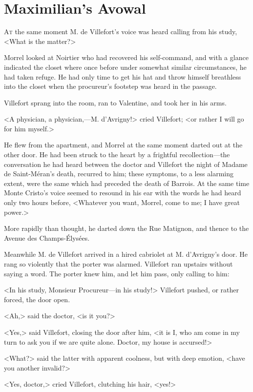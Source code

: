 \chapter{Maximilian's Avowal}

 \lettrine{A}{t} the same moment M. de Villefort's voice was heard calling from his study, <What is the matter?> 

\zz
 Morrel looked at Noirtier who had recovered his self-command, and with a glance indicated the closet where once before under somewhat similar circumstances, he had taken refuge. He had only time to get his hat and throw himself breathless into the closet when the procureur's footstep was heard in the passage. 

 Villefort sprang into the room, ran to Valentine, and took her in his arms. 

 <A physician, a physician,—M. d'Avrigny!> cried Villefort; <or rather I will go for him myself.> 

 He flew from the apartment, and Morrel at the same moment darted out at the other door. He had been struck to the heart by a frightful recollection—the conversation he had heard between the doctor and Villefort the night of Madame de Saint-Méran's death, recurred to him; these symptoms, to a less alarming extent, were the same which had preceded the death of Barrois. At the same time Monte Cristo's voice seemed to resound in his ear with the words he had heard only two hours before, <Whatever you want, Morrel, come to me; I have great power.> 

 More rapidly than thought, he darted down the Rue Matignon, and thence to the Avenue des Champs-Élysées. 

 Meanwhile M. de Villefort arrived in a hired cabriolet at M. d'Avrigny's door. He rang so violently that the porter was alarmed. Villefort ran upstairs without saying a word. The porter knew him, and let him pass, only calling to him: 

 <In his study, Monsieur Procureur—in his study!> Villefort pushed, or rather forced, the door open. 

 <Ah,> said the doctor, <is it you?> 

 <Yes,> said Villefort, closing the door after him, <it is I, who am come in my turn to ask you if we are quite alone. Doctor, my house is accursed!> 

 <What?> said the latter with apparent coolness, but with deep emotion, <have you another invalid?> 

 <Yes, doctor,> cried Villefort, clutching his hair, <yes!> 

